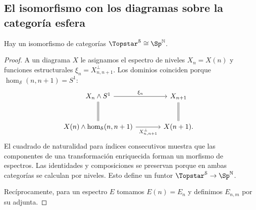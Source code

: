 \subsection{El isomorfismo con los diagramas sobre la categoría esfera}

\begin{prop}\label{prop:c26-espectros-diagrama}
Hay un isomorfismo de categorías $\Topstar^{\mathcal S}\cong\Sp^{\mathbb N}$.
\end{prop}
\begin{proof}
A un diagrama $X$ le asignamos el espectro de niveles $X_n=X(n)$ y funciones estructurales $\xi_n=X_{n,n+1}^{\perp}$. Los dominios coinciden porque $\hom_{\mathcal S}(n,n+1)=S^1$:
\[
\begin{tikzcd}[column sep=large,row sep=large]
X_n\wedge S^1\arrow[r,"\xi_n"]\arrow[d,equal]&X_{n+1}\arrow[d,equal]\\
X(n)\wedge\hom_{\mathcal S}(n,n+1)
\arrow[r,"X_{n,n+1}^{\perp}"']&X(n+1).
\end{tikzcd}
\]
El cuadrado de naturalidad para índices consecutivos muestra que las componentes de una transformación enriquecida forman un morfismo de espectros. Las identidades y composiciones se preservan porque en ambas categorías se calculan por niveles. Esto define un funtor $\Topstar^{\mathcal S}\to\Sp^{\mathbb N}$.

Recíprocamente, para un espectro $E$ tomamos $E(n)=E_n$ y definimos $E_{n,m}$ por su adjunta.


\end{proof}
